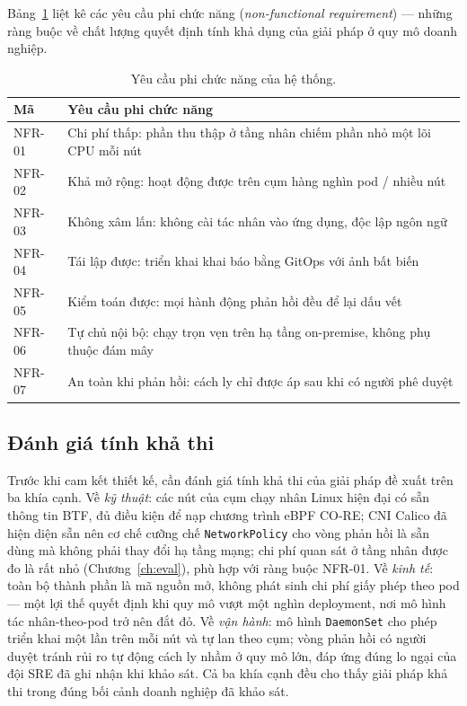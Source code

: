 Bảng~\ref{tab:nfr} liệt kê các yêu cầu phi chức năng (\textit{non-functional requirement})
--- những ràng buộc về chất lượng quyết định tính khả dụng của giải pháp ở quy mô doanh
nghiệp.

\begin{table}[H]
  \centering
  \caption{Yêu cầu phi chức năng của hệ thống.}
  \label{tab:nfr}
  \small
  \begin{tabularx}{\linewidth}{@{}l X@{}}
    \toprule
    \textbf{Mã} & \textbf{Yêu cầu phi chức năng} \\
    \midrule
    NFR-01 & Chi phí thấp: phần thu thập ở tầng nhân chiếm phần nhỏ một lõi CPU mỗi nút \\
    NFR-02 & Khả mở rộng: hoạt động được trên cụm hàng nghìn pod / nhiều nút \\
    NFR-03 & Không xâm lấn: không cài tác nhân vào ứng dụng, độc lập ngôn ngữ \\
    NFR-04 & Tái lập được: triển khai khai báo bằng GitOps với ảnh bất biến \\
    NFR-05 & Kiểm toán được: mọi hành động phản hồi đều để lại dấu vết \\
    NFR-06 & Tự chủ nội bộ: chạy trọn vẹn trên hạ tầng on-premise, không phụ thuộc đám mây \\
    NFR-07 & An toàn khi phản hồi: cách ly chỉ được áp sau khi có người phê duyệt \\
    \bottomrule
  \end{tabularx}
\end{table}

\subsection{Đánh giá tính khả thi}
\label{sec:feasibility}

Trước khi cam kết thiết kế, cần đánh giá tính khả thi của giải pháp đề xuất trên ba khía
cạnh. Về \emph{kỹ thuật}: các nút của cụm chạy nhân Linux hiện đại có sẵn thông tin BTF,
đủ điều kiện để nạp chương trình eBPF CO-RE; CNI Calico đã hiện diện sẵn nên cơ chế cưỡng
chế \texttt{NetworkPolicy} cho vòng phản hồi là sẵn dùng mà không phải thay đổi hạ tầng
mạng; chi phí quan sát ở tầng nhân được đo là rất nhỏ (Chương~\ref{ch:eval}), phù hợp với
ràng buộc NFR-01. Về \emph{kinh tế}: toàn bộ thành phần là mã nguồn mở, không phát sinh
chi phí giấy phép theo pod --- một lợi thế quyết định khi quy mô vượt một nghìn deployment,
nơi mô hình tác nhân-theo-pod trở nên đắt đỏ. Về \emph{vận hành}: mô hình \texttt{DaemonSet}
cho phép triển khai một lần trên mỗi nút và tự lan theo cụm; vòng phản hồi có người duyệt
tránh rủi ro tự động cách ly nhầm ở quy mô lớn, đáp ứng đúng lo ngại của đội SRE đã ghi
nhận khi khảo sát. Cả ba khía cạnh đều cho thấy giải pháp khả thi trong đúng bối cảnh
doanh nghiệp đã khảo sát.

